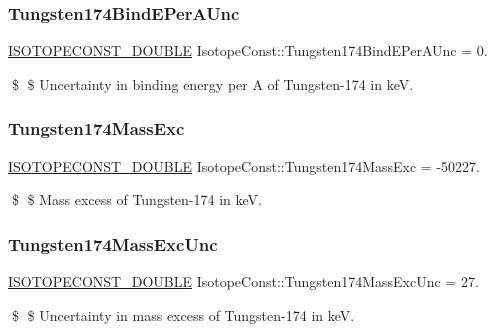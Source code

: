\subsubsection{\texorpdfstring{Tungsten174\+Bind\+E\+Per\+A\+Unc}{Tungsten174BindEPerAUnc}}
{\footnotesize\ttfamily \mbox{\hyperlink{group___isotope_const-_macros_ga8f45a7272ce02c0b4c65c44636ed719a}{I\+S\+O\+T\+O\+P\+E\+C\+O\+N\+S\+T\+\_\+\+D\+O\+U\+B\+LE}} Isotope\+Const\+::\+Tungsten174\+Bind\+E\+Per\+A\+Unc = 0.}

\$ \$ Uncertainty in binding energy per A of Tungsten-\/174 in keV. \mbox{\label{group___isotope_const-_tungsten-_w174_ga57db9d90168997b0091032eaf0539ff9}} 
\subsubsection{\texorpdfstring{Tungsten174\+Mass\+Exc}{Tungsten174MassExc}}
{\footnotesize\ttfamily \mbox{\hyperlink{group___isotope_const-_macros_ga8f45a7272ce02c0b4c65c44636ed719a}{I\+S\+O\+T\+O\+P\+E\+C\+O\+N\+S\+T\+\_\+\+D\+O\+U\+B\+LE}} Isotope\+Const\+::\+Tungsten174\+Mass\+Exc = -\/50227.}

\$ \$ Mass excess of Tungsten-\/174 in keV. \mbox{\label{group___isotope_const-_tungsten-_w174_gaf8e8a7e4871aa18dadeb5d542c4928fe}} 
\subsubsection{\texorpdfstring{Tungsten174\+Mass\+Exc\+Unc}{Tungsten174MassExcUnc}}
{\footnotesize\ttfamily \mbox{\hyperlink{group___isotope_const-_macros_ga8f45a7272ce02c0b4c65c44636ed719a}{I\+S\+O\+T\+O\+P\+E\+C\+O\+N\+S\+T\+\_\+\+D\+O\+U\+B\+LE}} Isotope\+Const\+::\+Tungsten174\+Mass\+Exc\+Unc = 27.}

\$ \$ Uncertainty in mass excess of Tungsten-\/174 in keV. \mbox{\label{group___isotope_const-_tungsten-_w174_gaa1adfd442163ab15f2ecfcddfb5243e6}} 
